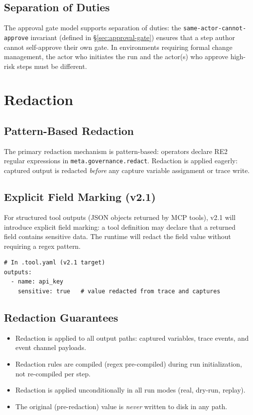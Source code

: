 \subsection{Separation of Duties}

The approval gate model supports separation of duties: the \texttt{same-actor-cannot-approve}
invariant (defined in §\ref{sec:approval-gate}) ensures that a step author cannot self-approve
their own gate. In environments requiring formal change management, the actor who initiates
the run and the actor(s) who approve high-risk steps must be different.

\section{Redaction}

\subsection{Pattern-Based Redaction}

The primary redaction mechanism is pattern-based: operators declare RE2 regular expressions
in \texttt{meta.governance.redact}. Redaction is applied eagerly: captured output is
redacted \emph{before} any capture variable assignment or trace write.

\subsection{Explicit Field Marking (v2.1)}

For structured tool outputs (JSON objects returned by MCP tools), v2.1 will introduce explicit
field marking: a tool definition may declare that a returned field contains sensitive data.
The runtime will redact the field value without requiring a regex pattern.

\begin{verbatim}
# In .tool.yaml (v2.1 target)
outputs:
  - name: api_key
    sensitive: true   # value redacted from trace and captures
\end{verbatim}

\subsection{Redaction Guarantees}

\begin{itemize}
  \item Redaction is applied to all output paths: captured variables, trace events, and
        event channel payloads.
  \item Redaction rules are compiled (regex pre-compiled) during run initialization, not
        re-compiled per step.
  \item Redaction is applied unconditionally in all run modes (real, dry-run, replay).
  \item The original (pre-redaction) value is \emph{never} written to disk in any path.
\end{itemize}

